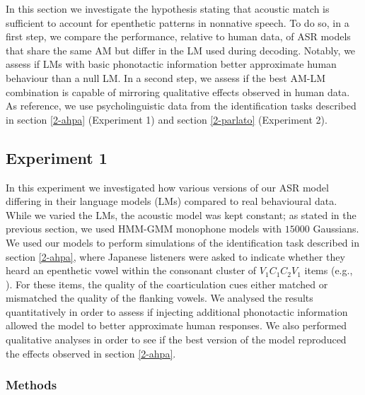 In this section we investigate the hypothesis stating that acoustic match is sufficient to account for epenthetic patterns in nonnative speech. To do so, in a first step, we compare the performance, relative to human data, of ASR models that share the same AM but differ in the LM used during decoding. Notably, we assess if LMs with basic phonotactic information better approximate human behaviour than a null LM. In a second step, we assess if the best AM-LM combination is capable of mirroring qualitative effects observed in human data.
As reference, we use psycholinguistic data from the identification tasks described in section \ref{2-ahpa} (Experiment 1) and section \ref{2-parlato} (Experiment 2). 


\subsection{Experiment 1}%
In this experiment we investigated how various versions of our ASR model differing in their language models (LMs) compared to real behavioural data. While we varied the LMs, the acoustic model was kept constant; as stated in the previous section, we used HMM-GMM monophone models with $15000$ Gaussians. We used our models to perform simulations of the identification task described in section \ref{2-ahpa}, where Japanese listeners were asked to indicate whether they heard an epenthetic vowel within the consonant cluster of $V_{1}C_{1}C_{2}V_{1}$ items (e.g., ). For these items, the quality of the coarticulation cues either matched or mismatched the quality of the flanking vowels. We analysed the results quantitatively in order to assess if injecting additional phonotactic information allowed the model to better approximate human responses. We also performed qualitative analyses in order to see if the best version of the model reproduced the effects observed in section \ref{2-ahpa}. 

\subsubsection{Methods}
